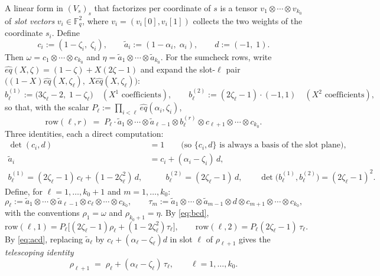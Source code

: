 \documentclass{article}
\newcommand{\Fq}{\mathbb{F}_q}
\theoremstyle{definition}
\begin{document}
A linear form in $(V_s)_s$ that factorizes per coordinate of $s$ is a tensor $v_1 \otimes \cdots \otimes v_{k_0}$ of \emph{slot vectors} $v_i \in \Fq^2$, where $v_i = (v_i[0], v_i[1])$ collects the two weights of the coordinate $s_i$. Define
\[
c_i := (1 - \zeta_i,\; \zeta_i), \qquad \tilde{a}_i := (1 - \alpha_i,\; \alpha_i), \qquad d := (-1,\; 1) .
\]
Then $\omega = c_1 \otimes \cdots \otimes c_{k_0}$ and $\eta = \tilde{a}_1 \otimes \cdots \otimes \tilde{a}_{k_0}$. For the sumcheck rows, write $\hat{eq}(X, \zeta) = (1 - \zeta) + X(2\zeta - 1)$ and expand the slot-$\ell$ pair $\big((1-X)\hat{eq}(X, \zeta_\ell),\; X \hat{eq}(X, \zeta_\ell)\big)$:
\[
b^{(1)}_\ell := \big(3\zeta_\ell - 2,\; 1 - \zeta_\ell\big) \quad (X^1 \text{ coefficients}), \qquad
b^{(2)}_\ell := (2\zeta_\ell - 1) \cdot (-1, 1) \quad (X^2 \text{ coefficients}),
\]
so that, with the scalar $P_\ell := \prod_{i < \ell} \hat{eq}(\alpha_i, \zeta_i)$,
\[
\text{row}(\ell, r) \;=\; P_\ell \cdot \tilde{a}_1 \otimes \cdots \otimes \tilde{a}_{\ell - 1} \otimes b^{(r)}_\ell \otimes c_{\ell + 1} \otimes \cdots \otimes c_{k_0} .
\]
Three identities, each a direct computation:
\begin{align}
\det(c_i, d) &= 1 \qquad \text{(so $\{c_i, d\}$ is always a basis of the slot plane)}, \label{eq:cd}\\
\tilde{a}_i &= c_i + (\alpha_i - \zeta_i)\, d , \label{eq:acd}\\
b^{(1)}_\ell = (2\zeta_\ell - 1)\, c_\ell + (1 - 2\zeta_\ell^2)\, d , &\qquad b^{(2)}_\ell = (2\zeta_\ell - 1)\, d , \qquad \det\big(b^{(1)}_\ell, b^{(2)}_\ell\big) = (2\zeta_\ell - 1)^2 . \label{eq:bcd}
\end{align}
Define, for $\ell = 1, \dots, k_0 + 1$ and $m = 1, \dots, k_0$:
\[
\rho_\ell := \tilde{a}_1 \otimes \cdots \otimes \tilde{a}_{\ell-1} \otimes c_\ell \otimes \cdots \otimes c_{k_0}, \qquad
\tau_m := \tilde{a}_1 \otimes \cdots \otimes \tilde{a}_{m-1} \otimes d \otimes c_{m+1} \otimes \cdots \otimes c_{k_0},
\]
with the conventions $\rho_1 = \omega$ and $\rho_{k_0 + 1} = \eta$. By \cref{eq:bcd},
\begin{equation}\label{eq:rows}
\text{row}(\ell, 1) = P_\ell \big[(2\zeta_\ell - 1)\rho_\ell + (1 - 2\zeta_\ell^2)\tau_\ell\big], \qquad \text{row}(\ell, 2) = P_\ell (2\zeta_\ell - 1)\, \tau_\ell .
\end{equation}
By \cref{eq:acd}, replacing $\tilde{a}_\ell$ by $c_\ell + (\alpha_\ell - \zeta_\ell)d$ in slot $\ell$ of $\rho_{\ell + 1}$ gives the \emph{telescoping identity}
\begin{equation}\label{eq:telescope}
\rho_{\ell + 1} \;=\; \rho_\ell + (\alpha_\ell - \zeta_\ell)\, \tau_\ell , \qquad \ell = 1, \dots, k_0 .
\end{equation}
\end{document}
